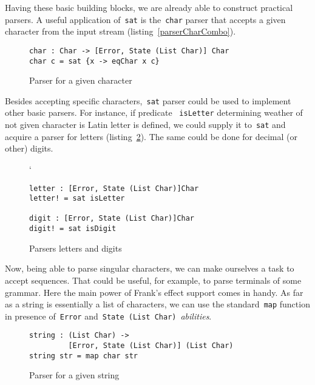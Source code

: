     Having these basic building blocks, we are already able to construct
    practical parsers. A useful application of~\texttt{sat} is
    the~\texttt{char} parser that accepts a given character from the input
    stream (listing~\ref{parserCharCombo}).

    \begin{figure}[h]
    \begin{lstlisting}
char : Char -> [Error, State (List Char)] Char
char c = sat {x -> eqChar x c}
    \end{lstlisting}
    \caption{Parser for a given character}
    \label{listing:parserCharCombo}
    \end{figure}

    Besides accepting specific characters,~\texttt{sat} parser could be used
    to implement other basic parsers. For instance, if predicate
    ~\texttt{isLetter} determining weather of not given character is Latin letter is defined, we could supply it to~\texttt{sat} and acquire a parser for letters (listing~\ref{listing:parserLetterCombo}). The same could be done for decimal
    (or other) digits.

    \begin{figure}[h]`
    \begin{lstlisting}
letter : [Error, State (List Char)]Char
letter! = sat isLetter

digit : [Error, State (List Char)]Char
digit! = sat isDigit
    \end{lstlisting}
    \caption{Parsers letters and digits}
    \label{listing:parserLetterCombo}
    \end{figure}

    Now, being able to parse singular characters, we can make ourselves a task
    to accept sequences. That could be useful, for example, to parse terminals of
    some grammar. Here the main power of Frank's effect support comes in handy.
    As far as a string is essentially a list of characters, we can use the
    standard~\texttt{map} function in presence of~\texttt{Error}
    and~\texttt{State (List Char)}~\emph{abilities}.

    \begin{figure}[h]
    \begin{lstlisting}
string : (List Char) ->
         [Error, State (List Char)] (List Char)
string str = map char str
    \end{lstlisting}
    \caption{Parser for a given string}
    \label{listing:parserStrCombo}
    \end{figure}

